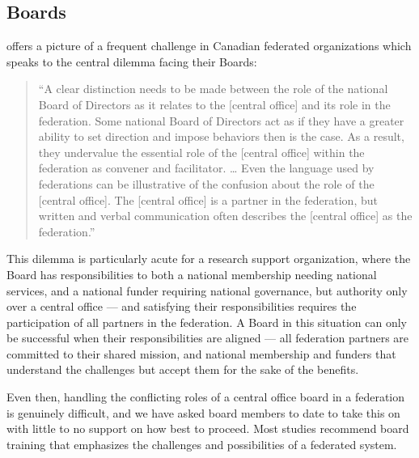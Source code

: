 \documentclass[11pt, letterpaper, twoside]{article}
\begin{document}
\subsection*{Boards}
%


\cite{mollenhauer_framework} offers a picture of a frequent challenge in Canadian
federated organizations which speaks to the central dilemma facing their
Boards:

\begin{quote}
``A clear distinction needs to be made between the role of the national
Board of Directors as it relates to the {[}central office{]} and its
role in the federation. Some national Board of Directors act as if they
have a greater ability to set direction and impose behaviors then is the
case. As a result, they undervalue the essential role of the {[}central
office{]} within the federation as convener and facilitator. \ldots{}
Even the language used by federations can be illustrative of the
confusion about the role of the {[}central office{]}. The {[}central
office{]} is a partner in the federation, but written and verbal
communication often describes the {[}central office{]} as the
federation.''
\end{quote}

This dilemma is particularly acute for a research support organization,
where the Board has responsibilities to both a national membership
needing national services, and a national funder requiring national
governance, but authority only over a central office --- and satisfying
their responsibilities requires the participation of all partners in the
federation. A Board in this situation can only be successful when their
responsibilities are aligned --- all federation partners are committed
to their shared mission, and national membership and funders that
understand the challenges but accept them for the sake of the benefits.

Even then, handling the conflicting roles of a central office board in a
federation is genuinely difficult, and we have asked board members to
date to take this on with little to no support on how best to proceed.
Most studies recommend board training that emphasizes the challenges and
possibilities of a federated system.

\end{document}
